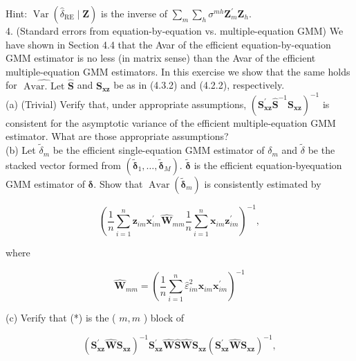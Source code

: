 \documentclass[10pt]{article}
\begin{document}
Hint: $\operatorname{Var}\left(\hat{\delta}_{\mathrm{RE}} \mid \mathbf{Z}\right)$ is the inverse of $\sum_{m} \sum_{h} \sigma^{m h} \mathbf{Z}_{m}^{\prime} \mathbf{Z}_{h}$.\\
4. (Standard errors from equation-by-equation vs. multiple-equation GMM) We have shown in Section 4.4 that the Avar of the efficient equation-by-equation GMM estimator is no less (in matrix sense) than the Avar of the efficient multiple-equation GMM estimators. In this exercise we show that the same holds for $\widehat{\text { Avar. Let }} \widehat{\mathbf{S}}$ and $\mathbf{S}_{\mathbf{x z}}$ be as in (4.3.2) and (4.2.2), respectively.\\
(a) (Trivial) Verify that, under appropriate assumptions, $\left(\mathbf{S}_{\mathbf{x z}}^{\prime} \widehat{\mathbf{S}}^{-1} \mathbf{S}_{\mathbf{x z}}\right)^{-1}$ is consistent for the asymptotic variance of the efficient multiple-equation GMM estimator. What are those appropriate assumptions?\\
(b) Let $\tilde{\delta}_{m}$ be the efficient single-equation GMM estimator of $\delta_{m}$ and $\tilde{\delta}$ be the stacked vector formed from $\left(\tilde{\boldsymbol{\delta}}_{1}, \ldots, \tilde{\boldsymbol{\delta}}_{M}\right)$. $\tilde{\boldsymbol{\delta}}$ is the efficient equation-byequation GMM estimator of $\boldsymbol{\delta}$. Show that $\operatorname{Avar}\left(\tilde{\boldsymbol{\delta}}_{m}\right)$ is consistently estimated by


\begin{equation*}
\left(\frac{1}{n} \sum_{i=1}^{n} \mathbf{z}_{i m} \mathbf{x}_{i m}^{\prime} \widehat{\mathbf{W}}_{m m} \frac{1}{n} \sum_{i=1}^{n} \mathbf{x}_{i m} \mathbf{z}_{i m}^{\prime}\right)^{-1}, \tag{*}
\end{equation*}


where

$$
\widehat{\mathbf{W}}_{m m}=\left(\frac{1}{n} \sum_{i=1}^{n} \hat{\varepsilon}_{i m}^{2} \mathbf{x}_{i m} \mathbf{x}_{i m}^{\prime}\right)^{-1}
$$

(c) Verify that (*) is the ( $m, m$ ) block of


\begin{equation*}
\left(\mathbf{S}_{\mathbf{x z}}^{\prime} \widehat{\mathbf{W}} \mathbf{S}_{\mathbf{x z}}\right)^{-1} \mathbf{S}_{\mathbf{x z}}^{\prime} \widehat{\mathbf{W}} \widehat{\mathbf{S}} \widehat{\mathbf{W}} \mathbf{S}_{\mathbf{x z}}\left(\mathbf{S}_{\mathbf{x z}}^{\prime} \widehat{\mathbf{W}} \mathbf{S}_{\mathbf{x z}}\right)^{-1}, \tag{**}
\end{equation*}
\end{document}

